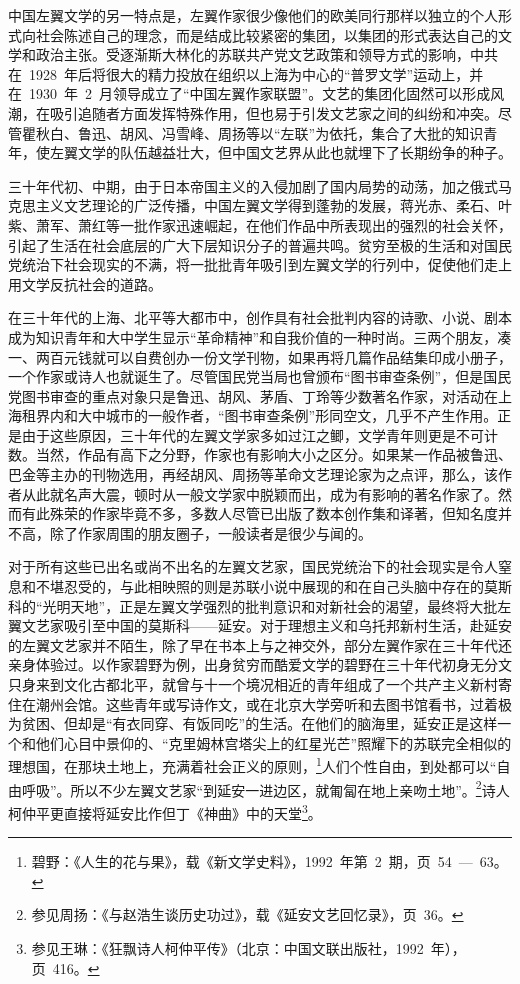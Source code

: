 中国左翼文学的另一特点是，左翼作家很少像他们的欧美同行那样以独立的个人形式向社会陈述自己的理念，而是结成比较紧密的集团，以集团的形式表达自己的文学和政治主张。受逐渐斯大林化的苏联共产党文艺政策和领导方式的影响，中共在~1928~年后将很大的精力投放在组织以上海为中心的“普罗文学”运动上，并在~1930~年~2~月领导成立了“中国左翼作家联盟”。文艺的集团化固然可以形成风潮，在吸引追随者方面发挥特殊作用，但也易于引发文艺家之间的纠纷和冲突。尽管瞿秋白、鲁迅、胡风、冯雪峰、周扬等以“左联”为依托，集合了大批的知识青年，使左翼文学的队伍越益壮大，但中国文艺界从此也就埋下了长期纷争的种子。

三十年代初、中期，由于日本帝国主义的入侵加剧了国内局势的动荡，加之俄式马克思主义文艺理论的广泛传播，中国左翼文学得到蓬勃的发展，蒋光赤、柔石、叶紫、萧军、萧红等一批作家迅速崛起，在他们作品中所表现出的强烈的社会关怀，引起了生活在社会底层的广大下层知识分子的普遍共鸣。贫穷至极的生活和对国民党统治下社会现实的不满，将一批批青年吸引到左翼文学的行列中，促使他们走上用文学反抗社会的道路。

在三十年代的上海、北平等大都市中，创作具有社会批判内容的诗歌、小说、剧本成为知识青年和大中学生显示“革命精神”和自我价值的一种时尚。三两个朋友，凑一、两百元钱就可以自费创办一份文学刊物，如果再将几篇作品结集印成小册子，一个作家或诗人也就诞生了。尽管国民党当局也曾颁布“图书审查条例”，但是国民党图书审查的重点对象只是鲁迅、胡风、茅盾、丁玲等少数著名作家，对活动在上海租界内和大中城市的一般作者，“图书审查条例”形同空文，几乎不产生作用。正是由于这些原因，三十年代的左翼文学家多如过江之鲫，文学青年则更是不可计数。当然，作品有高下之分野，作家也有影响大小之区分。如果某一作品被鲁迅、巴金等主办的刊物选用，再经胡风、周扬等革命文艺理论家为之点评，那么，该作者从此就名声大震，顿时从一般文学家中脱颖而出，成为有影响的著名作家了。然而有此殊荣的作家毕竟不多，多数人尽管已出版了数本创作集和译著，但知名度并不高，除了作家周围的朋友圈子，一般读者是很少与闻的。

对于所有这些已出名或尚不出名的左翼文艺家，国民党统治下的社会现实是令人窒息和不堪忍受的，与此相映照的则是苏联小说中展现的和在自己头脑中存在的莫斯科的“光明天地”，正是左翼文学强烈的批判意识和对新社会的渴望，最终将大批左翼文艺家吸引至中国的莫斯科——延安。对于理想主义和乌托邦新村生活，赴延安的左翼文艺家并不陌生，除了早在书本上与之神交外，部分左翼作家在三十年代还亲身体验过。以作家碧野为例，出身贫穷而酷爱文学的碧野在三十年代初身无分文只身来到文化古都北平，就曾与十一个境况相近的青年组成了一个共产主义新村寄住在潮州会馆。这些青年或写诗作文，或在北京大学旁听和去图书馆看书，过着极为贫困、但却是“有衣同穿、有饭同吃”的生活。在他们的脑海里，延安正是这样一个和他们心目中景仰的、“克里姆林宫塔尖上的红星光芒”照耀下的苏联完全相似的理想国，在那块土地上，充满着社会正义的原则，\footnote{碧野：《人生的花与果》，载《新文学史料》，1992~年第~2~期，页~54~—~63。}人们个性自由，到处都可以“自由呼吸”。所以不少左翼文艺家“到延安一进边区，就匍匐在地上亲吻土地”。\footnote{参见周扬：《与赵浩生谈历史功过》，载《延安文艺回忆录》，页~36。}诗人柯仲平更直接将延安比作但丁《神曲》中的天堂\footnote{参见王琳：《狂飘诗人柯仲平传》（北京：中国文联出版社，1992~年），页~416。}。

